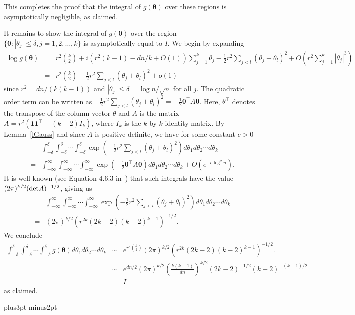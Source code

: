 \documentclass[12pt]{article}
\def\blackslug{\hbox{\kern1pt\vrule height6pt width4pt  depth1pt\kern1pt}}
\def\qed{\penalty 500\hbox{\quad\blackslug}\ifmmode\else\par
                                             \vskip4.5pt plus3pt minus2pt\fi}
\def\transpose{\top}
\begin{document}
This completes the proof that the integral of $g(\mathbf{\theta})$ 
over these regions is asymptotically negligible, as claimed.

It remains to show the integral of $g(\mathbf{\theta})$ over the region
$\{ \mathbf{\theta} : |\theta_j| \leq \delta, j = 1, 2, \ldots, k \}$ is
asymptotically equal to $I$. We begin by expanding
\begin{eqnarray*}
\log g(\mathbf{\theta})
&=&
r^2\binom{k}{2}
+ i(r^2(k-1)-dn/k + O(1)) \sum_{j=1}^k \theta_j
-\frac{1}{2}r^2 \sum_{j<l}(\theta_j + \theta_l)^2
+ O(r^2 \sum_{j=1}^k |\theta_j|^3)
\\
&=&
r^2\binom{k}{2}
-\frac{1}{2}r^2 \sum_{j<l}(\theta_j + \theta_l)^2
+o(1)
\end{eqnarray*}
since $r^2=dn/(k(k-1))$ and $|\theta_j| \leq \delta = \log n / \sqrt{n}$ for
all $j$.
The quadratic order term can be written as
$-\frac{1}{2}r^2 \sum_{j<l}(\theta_j + \theta_l)^2 = -\frac{1}{2} \mathbf{\theta^\transpose}A\mathbf{\theta}$. Here, $\theta^\transpose$ denotes the transpose of the column vector $\theta$ and $A$
is the matrix $A = r^2(\mathbf{1}\mathbf{1^\transpose}+(k-2)I_k)$, where $I_k$ is 
the $k$-by-$k$ identity matrix. By Lemma~\ref{lGauss} and since $A$ is positive definite, we have for some constant $c>0$
\begin{eqnarray*}
&&
\int_{-\delta}^{\delta}
\int_{-\delta}^{\delta}
\cdots
\int_{-\delta}^{\delta}
\exp\left(-\frac{1}{2}r^2 \sum_{j<l}(\theta_j + \theta_l)^2\right)
d\theta_1 d\theta_2 \cdots d\theta_k
\\
&=&
\int_{-\infty}^{\infty}
\int_{-\infty}^{\infty}
\cdots
\int_{-\infty}^{\infty}
\exp\left(-\frac{1}{2} \mathbf{\theta^\transpose}A\mathbf{\theta}\right)
d\theta_1 d\theta_2 \cdots d\theta_k
+ O(e^{-c\log^2 n}).
\end{eqnarray*}
It is well-known (see Equation 4.6.3 
in~\cite{DeB}) that
such integrals have the value $(2\pi)^{k/2} ({\rm det}A)^{-1/2}$, giving us
\begin{eqnarray*}
&&
\int_{-\infty}^{\infty}
\int_{-\infty}^{\infty}
\cdots
\int_{-\infty}^{\infty}
\exp\left(-\frac{1}{2}r^2 \sum_{j<l}(\theta_j + \theta_l)^2\right)
d\theta_1 d\theta_2 \cdots d\theta_k
\\
&=&
(2\pi)^{k/2} \left( r^{2k} (2k-2)(k-2)^{k-1}\right)^{-1/2}.
\end{eqnarray*}
We conclude
\begin{eqnarray*}
\int_{-\delta}^{\delta}
\int_{-\delta}^{\delta}
\cdots
\int_{-\delta}^{\delta}
g(\mathbf{\theta})
d\theta_1 d\theta_2 \cdots d\theta_k
&\sim&
e^{r^2\binom{k}{2}}
(2\pi)^{k/2} \left( r^{2k} (2k-2)(k-2)^{k-1}\right)^{-1/2}.
\\
&\sim&
e^{dn/2}
(2\pi)^{k/2} \left( \frac{k(k-1)}{dn} \right)^{k/2} 
(2k-2)^{-1/2}(k-2)^{-(k-1)/2}
\\
&=&
I
\end{eqnarray*}
as claimed.
\qed
\end{document}
